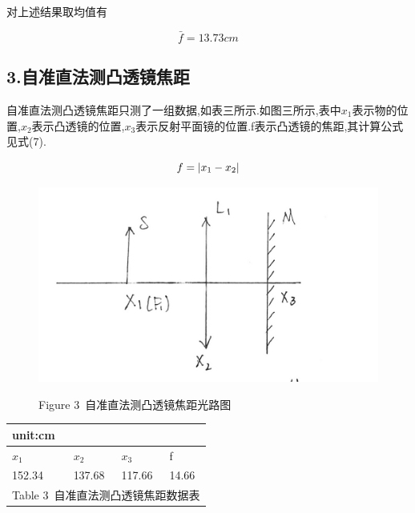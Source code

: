 \documentclass[a4paper,10pt,notitlepage]{report}
\begin{document}
	对上述结果取均值有
	
\begin{equation}
	\bar{f}=13.73cm
\end{equation}

\subsection*{3.自准直法测凸透镜焦距}

	自准直法测凸透镜焦距只测了一组数据,如表三所示.如图三所示,表中$x_1$表示物的位置,$x_2$表示凸透镜的位置,$x_3$表示反射平面镜的位置.f表示凸透镜的焦距,其计算公式见式(7).
	
\begin{equation}
	f=|x_1 - x_2| \\
\end{equation}
	
\begin{figure}
\centering

	\includegraphics[scale=0.1]{zzt.jpg}
	\begin{center}
		\scriptsize Figure 3\ 自准直法测凸透镜焦距光路图
	\end{center}
	
\end{figure}

\begin{table}[htbp]
\centering
\begin{tabular}{|l|l|l|l|}

	\multicolumn{1}{l}{\scriptsize unit:cm} \\
	\hline
	$x_1$ & $x_2$ & $x_3$ & f \\
	\hline
	152.34 & 137.68 & 117.66 & 14.66 \\
	\hline
	\multicolumn{4}{c}{\scriptsize Table 3\ 自准直法测凸透镜焦距数据表} \\

\end{tabular}
\end{table}
\end{document}
